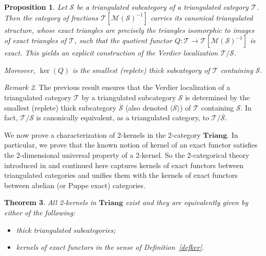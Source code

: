 \documentclass[11pt,reqno,a4paper]{amsart}
\newtheorem{theorem}{Theorem}[section]
\newtheorem{proposition}[theorem]{Proposition}
\theoremstyle{definition}
\theoremstyle{remark}
\newtheorem{remark}[theorem]{Remark}
\def\nameit#1{\textrm{#1}~}
\def\defx{\nameit{Definition}}
\newcommand{\T}{\mathcal{T}}
\renewcommand{\S}{\mathcal{S}}
\newcommand{\0}{\mathbf{0}}
\renewcommand{\1}{\mathbf{1}}
\newcommand{\Triang}{\mathbf{Triang}}
\def\:{\colon}
\begin{document}
\begin{proposition}\label{propVerdfacts}
   Let $\S$ be a triangulated subcategory of a triangulated category $\T$. Then the category of fractions $\T [\mathcal{M}(\S)^{-1}]$ carries its canonical triangulated structure, whose exact triangles are precisely the triangles isomorphic to images of exact triangles of $\T$, such that the quotient functor $Q\:\T\to \T [\mathcal{M}(\S)^{-1}]$ is exact. This yields an explicit construction of the Verdier localization $\T/\S$.


   Moreover, $\ker (Q)$ is the smallest (replete) thick subcategory of $\T$ containing $\S$.
\end{proposition}

\begin{remark}
    The previous result ensures that the Verdier localization of a triangulated category $\T$ by a triangulated subcategory $\S$ is determined by the smallest (replete) thick subcategory $\overline{\S}$ (also denoted $\langle\S\rangle$) of $\T$ containing $\S$. In fact, $\T/\S$ is canonically equivalent, as a triangulated category, to $\T/\overline{\S}$.
\end{remark}

We now prove a characterization of 2-kernels in the 2-category $\Triang$. In particular, we prove that the known notion of kernel of an exact functor satisfies the 2-dimensional universal property of a 2-kernel. So the 2-categorical theory introduced in \cite{CJM} and continued here captures kernels of exact functors between triangulated categories and unifies them with the kernels of exact functors between abelian (or Puppe exact) categories.

\begin{theorem}\label{teorchar2ker1}
    All 2-kernels in $\Triang$ exist and they are equivalently given by either of the following:
    \begin{itemize}
        \item [(i)] thick triangulated subcategories;
        \item [(ii)] kernels of exact functors in the sense of \defx \ref{defker}.
    \end{itemize}
\end{theorem}
\end{document}

